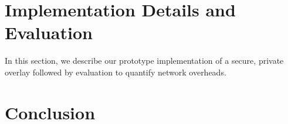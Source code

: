 \documentclass[conference]{IEEEtran}
\begin{document}
\section{Implementation Details and Evaluation}
\label{evaluations}
In this section, we describe our prototype implementation of a secure, private
overlay followed by evaluation to quantify network overheads.
\section{Conclusion}
\label{conclusions}



\suppressfloats
\end{document}
